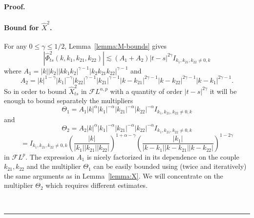 \documentclass[a4paper,11pt,reqno]{article}
\newcommand{\FF}{\mathcal{F}}
\newenvironment{proof}[1][Proof]{\textbf{#1.} }{\ \rule{0.5em}{0.5em}}
\begin{document}
\begin{proof}
\paragraph{Bound for $\hat X^2$.}
For any $0\le \gamma \le 1/2$, Lemma~\ref{lemma:M-bounds} gives
$$
|\hat \Phi^2_{ts}(k,k_1,k_{21},k_{22})|\lesssim (A_1+A_2)  |t-s|^{2\gamma} I_{k_1,k_{21},k_{22} \neq 0,k}
$$
where 
$
A_1 = |k| |k_2| |k k_1 k_2|^{\gamma-1} |k_2 k_{21} k_{22}|^{\gamma-1}
$
and
$$
A_2 = |k|^{1-\gamma}  |k_1|^{-\gamma}|k_{22}|^{\gamma-1}|k_{21}|^{\gamma-1}
|k-k_{21}|^{2\gamma-1} 
|k-k_{22}|^{2\gamma-1} |k-k_1|^{2\gamma-1} .
$$
So in order to bound $\hat X^2_{ts}$ in $\FF L^{\alpha,p}$ with a quantity of order $|t-s|^{2\gamma}$ it will be enough to bound separately
the multipliers
$$
\Theta_1 =  A_1 |k|^{\alpha} |k_1|^{-\alpha}
|k_{21}|^{-\alpha} |k_{22}|^{-\alpha} I_{k_1,k_{21},k_{22} \neq 0,k}
$$
and
$$
\Theta_2 =  A_2 |k|^{\alpha} |k_1|^{-\alpha}
|k_{21}|^{-\alpha} |k_{22}|^{-\alpha}  I_{k_1,k_{21},k_{22} \neq 0,k} 
$$
$$
= I_{k_1,k_{21},k_{22} \neq 0,k}\left( \frac{|k|}{|k_1||k_{21}||k_{22}|}\right)^{1+\alpha-\gamma}
\left( \frac{|k_1|}{|k-k_1||k-k_{21}||k-k_{22}|}\right)^{1-2\gamma}
$$
in $\FF L^p$.
The expression $A_1$ is nicely factorized in its dependence on the
couple $k_{21},k_{22}$ and  the multiplier $\Theta_1$ can be easily bounded
using (twice and iteratively) the same arguments as in
Lemma~\ref{lemma:X}.
We will concentrate on the multiplier $\Theta_2$ which requires  different
estimates. 


\end{proof}
\end{document}
